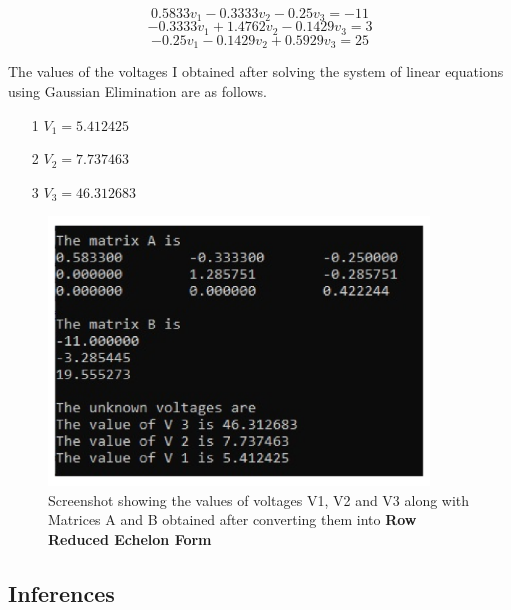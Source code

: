 \documentclass[titlepage, 11pt]{article}
\begin{document}
\begin{equation}
    0.5833 v_1 - 0.3333 v_2 - 0.25 v_3 = -11
\end{equation}
\begin{equation}
    -0.3333 v_1 + 1.4762 v_2 - 0.1429 v_3 = 3
\end{equation}
\begin{equation}
    -0.25 v_1 - 0.1429 v_2 + 0.5929 v_3 = 25
\end{equation}

The values of the voltages I obtained after solving the system of linear equations using Gaussian Elimination are as follows. 
\begin{itemize}
    \item [1] $V_1 = 5.412425$
    \item [2] $V_2 = 7.737463$
    \item [3] $V_3 = 46.312683$
\end{itemize}

\begin{figure}[!tbh]
  	\centering
  	\includegraphics[width=0.9\textwidth]{Problem1.pdf}  
  	\caption{Screenshot showing the values of voltages V1, V2 and V3 along with Matrices A and B obtained after converting them into \textbf{Row Reduced Echelon Form}}
  	\label{fig:q12} 
\end{figure}



\subsection{Inferences}
\end{document}
